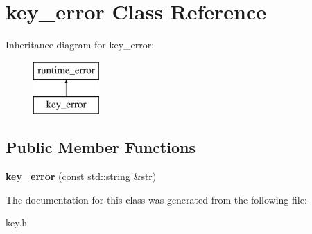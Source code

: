 \hypertarget{classkey__error}{}\section{key\+\_\+error Class Reference}
\label{classkey__error}
Inheritance diagram for key\+\_\+error\+:\begin{figure}[H]
\begin{center}
\leavevmode
\includegraphics[height=2.000000cm]{classkey__error}
\end{center}
\end{figure}
\subsection*{Public Member Functions}
\begin{DoxyCompactItemize}
\item 
\mbox{\label{classkey__error_a358614d23388e7a3f3298d9387b77566}} 
{\bfseries key\+\_\+error} (const std\+::string \&str)
\end{DoxyCompactItemize}


The documentation for this class was generated from the following file\+:\begin{DoxyCompactItemize}
\item 
key.\+h\end{DoxyCompactItemize}
